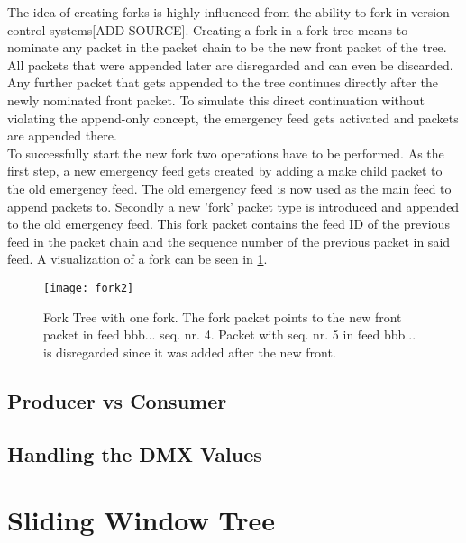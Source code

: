 The idea of creating forks is highly influenced from the ability to fork in version control systems[ADD SOURCE]. Creating a fork in a fork tree means to nominate any packet in the packet chain to be the new front packet of the tree. All packets that were appended later are disregarded and can even be discarded. Any further packet that gets appended to the tree continues directly after the newly nominated front packet. To simulate this direct continuation without violating the append-only concept, the emergency feed gets activated and packets are appended there. \\
To successfully start the new fork two operations have to be performed. As the first step, a new emergency feed gets created by adding a make child packet to the old emergency feed. The old emergency feed is now used as the main feed to append packets to. Secondly a new 'fork' packet type is introduced and appended to the old emergency feed. This fork packet contains the feed ID of the previous feed in the packet chain and the sequence number of the previous packet in said feed. A visualization of a fork can be seen in \cref{fig:fork2}.

\begin{figure}
\centering
\texttt{[image: fork2]}
\caption{Fork Tree with one fork. The fork packet points to the new front packet in feed bbb... seq. nr. 4. Packet with seq. nr. 5 in feed bbb... is disregarded since it was added after the new front.}
\label{fig:fork2}
\end{figure}

\subsection{Producer vs Consumer}

\subsection{Handling the DMX Values}
\label{sec:dmxfork}


\section{Sliding Window Tree}
